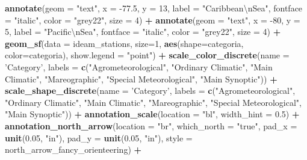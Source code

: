 \documentclass[12pt,oneside]{reedthesis}
\newenvironment{Shaded}{\begin{snugshade}}{\end{snugshade}}
\newcommand{\CharTok}[1]{\textcolor[rgb]{0.31,0.60,0.02}{#1}}
\newcommand{\DataTypeTok}[1]{\textcolor[rgb]{0.13,0.29,0.53}{#1}}
\newcommand{\DecValTok}[1]{\textcolor[rgb]{0.00,0.00,0.81}{#1}}
\newcommand{\FloatTok}[1]{\textcolor[rgb]{0.00,0.00,0.81}{#1}}
\newcommand{\KeywordTok}[1]{\textcolor[rgb]{0.13,0.29,0.53}{\textbf{#1}}}
\newcommand{\NormalTok}[1]{#1}
\newcommand{\OperatorTok}[1]{\textcolor[rgb]{0.81,0.36,0.00}{\textbf{#1}}}
\newcommand{\StringTok}[1]{\textcolor[rgb]{0.31,0.60,0.02}{#1}}
\begin{document}
\begin{Shaded}
\begin{Highlighting}[]
\StringTok{  }\KeywordTok{annotate}\NormalTok{(}\DataTypeTok{geom =} \StringTok{"text"}\NormalTok{, }\DataTypeTok{x =} \FloatTok{-77.5}\NormalTok{, }\DataTypeTok{y =} \DecValTok{13}\NormalTok{, }\DataTypeTok{label =} \StringTok{"Caribbean}\CharTok{\textbackslash{}n}\StringTok{Sea"}\NormalTok{, }\DataTypeTok{fontface =} \StringTok{"italic"}\NormalTok{, }\DataTypeTok{color =} \StringTok{"grey22"}\NormalTok{, }\DataTypeTok{size =} \DecValTok{4}\NormalTok{) }\OperatorTok{+}\StringTok{ }
\StringTok{  }\KeywordTok{annotate}\NormalTok{(}\DataTypeTok{geom =} \StringTok{"text"}\NormalTok{, }\DataTypeTok{x =} \DecValTok{-80}\NormalTok{, }\DataTypeTok{y =} \DecValTok{5}\NormalTok{, }\DataTypeTok{label =} \StringTok{"Pacific}\CharTok{\textbackslash{}n}\StringTok{Sea"}\NormalTok{, }\DataTypeTok{fontface =} \StringTok{"italic"}\NormalTok{, }\DataTypeTok{color =} \StringTok{"grey22"}\NormalTok{, }\DataTypeTok{size =} \DecValTok{4}\NormalTok{) }\OperatorTok{+}
\StringTok{  }\KeywordTok{geom_sf}\NormalTok{(}\DataTypeTok{data =}\NormalTok{ ideam_stations, }\DataTypeTok{size=}\DecValTok{1}\NormalTok{, }\KeywordTok{aes}\NormalTok{(}\DataTypeTok{shape=}\NormalTok{categoria, }\DataTypeTok{color=}\NormalTok{categoria), }\DataTypeTok{show.legend =} \StringTok{"point"}\NormalTok{) }\OperatorTok{+}\StringTok{ }
\StringTok{  }\KeywordTok{scale_color_discrete}\NormalTok{(}\DataTypeTok{name =} \StringTok{'Category'}\NormalTok{, }\DataTypeTok{labels =} \KeywordTok{c}\NormalTok{(}\StringTok{"Agrometeorological"}\NormalTok{, }\StringTok{"Ordinary Climatic"}\NormalTok{, }\StringTok{"Main Climatic"}\NormalTok{, }\StringTok{"Mareographic"}\NormalTok{, }\StringTok{"Special Meteorological"}\NormalTok{, }\StringTok{"Main Synoptic"}\NormalTok{)) }\OperatorTok{+}
\StringTok{  }\KeywordTok{scale_shape_discrete}\NormalTok{(}\DataTypeTok{name =} \StringTok{'Category'}\NormalTok{, }\DataTypeTok{labels =} \KeywordTok{c}\NormalTok{(}\StringTok{"Agrometeorological"}\NormalTok{, }\StringTok{"Ordinary Climatic"}\NormalTok{, }\StringTok{"Main Climatic"}\NormalTok{, }\StringTok{"Mareographic"}\NormalTok{, }\StringTok{"Special Meteorological"}\NormalTok{, }\StringTok{"Main Synoptic"}\NormalTok{)) }\OperatorTok{+}\StringTok{  }
\StringTok{  }\KeywordTok{annotation_scale}\NormalTok{(}\DataTypeTok{location =} \StringTok{"bl"}\NormalTok{, }\DataTypeTok{width_hint =} \FloatTok{0.5}\NormalTok{) }\OperatorTok{+}\StringTok{ }\KeywordTok{annotation_north_arrow}\NormalTok{(}\DataTypeTok{location =} \StringTok{"br"}\NormalTok{, }\DataTypeTok{which_north =} \StringTok{"true"}\NormalTok{, }\DataTypeTok{pad_x =} \KeywordTok{unit}\NormalTok{(}\FloatTok{0.05}\NormalTok{, }\StringTok{"in"}\NormalTok{), }\DataTypeTok{pad_y =} \KeywordTok{unit}\NormalTok{(}\FloatTok{0.05}\NormalTok{, }\StringTok{"in"}\NormalTok{), }\DataTypeTok{style =}\NormalTok{ north_arrow_fancy_orienteering) }\OperatorTok{+}\StringTok{ }

\end{Highlighting}
\end{Shaded}
\end{document}
